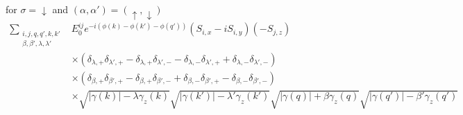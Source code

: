 for $\sigma = \downarrow$ and $(\alpha, \alpha') =(\uparrow, \downarrow)$
\begin{align} 
    \sum_{\substack{i, j, q,q', k, k'\\ \beta, \beta', \lambda, \lambda' }} &E^{ij}_0 e^{-i(\phi(k)-\phi(k')-\phi(q'))} \left(S_{i,x}-iS_{i,y} \right) \left( -S_{j,z} \right)\\ \nonumber
   &\times \left( \delta_{\lambda,+}\delta_{\lambda',+} - \delta_{\lambda,+}\delta_{\lambda',-} -\delta_{\lambda,-}\delta_{\lambda',+} +\delta_{\lambda,-}\delta_{\lambda',-}\right)\\\nonumber
   &\times \left( \delta_{\beta,+}\delta_{\beta',+} -\delta_{\beta,+}\delta_{\beta',-} +\delta_{\beta,-}\delta_{\beta',+} -\delta_{\beta,-}\delta_{\beta',-}\right)\\\nonumber
   &\times \sqrt{|\gamma(k)|- \lambda\gamma_z(k)}\sqrt{|\gamma(k')|- \lambda'\gamma_z(k')}\sqrt{|\gamma(q)|+\beta \gamma_z(q)}\sqrt{|\gamma(q')|- \beta' \gamma_z(q')}
\end{align}